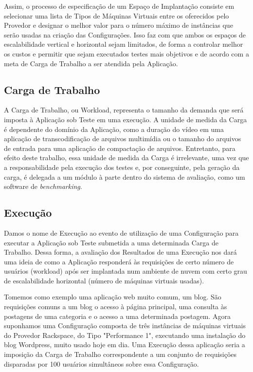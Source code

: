 Assim, o processo de especificação de um Espaço de Implantação consiste em 
selecionar uma lista de Tipos de Máquinas Virtuais entre os oferecidos pelo 
Provedor e designar o melhor valor para o número máximo de instâncias que serão 
usadas na criação das Configurações. Isso faz com que ambos os espaços de 
escalabilidade vertical e horizontal sejam limitados, de forma a controlar 
melhor os custos e permitir que sejam executados testes mais objetivos e de 
acordo com a meta de Carga de Trabalho a ser atendida pela Aplicação.

\subsection{Carga de Trabalho}
A Carga de Trabalho, ou Workload, representa o tamanho da demanda que será 
imposta à Aplicação sob Teste em uma execução. A unidade de medida da Carga é 
dependente do domínio da Aplicação, como a duração do vídeo em uma aplicação
de transcodificação de arquivos multimídia ou o tamanho do arquivos de entrada
para uma aplicação de compactação de arquivos. Entretanto, para efeito deste 
trabalho, essa unidade de medida da Carga é irrelevante, uma vez que a 
responsabilidade pela execução dos testes e, por conseguinte, pela geração da 
carga, é delegada a um módulo à parte dentro do sistema de avaliação, como um
software de \emph{benchmarking}.

\subsection{Execução}
Damos o nome de Execução ao evento de utilização de uma Configuração para 
executar a Aplicação sob Teste submetida a uma determinada Carga de Trabalho. 
Dessa forma, a avaliação dos Resultados de uma Execução nos dará uma ideia de 
como a Aplicação responderá às requisições de certo número de usuários (workload) 
após ser implantada num ambiente de nuvem com certo grau de escalabilidade 
horizontal (número de máquinas virtuais usadas). 

Tomemos como exemplo uma aplicação web muito comum, um blog. São requisições 
comuns a um blog o acesso à página principal, uma consulta às postagens de uma
categoria e o acesso a uma determinada postagem. Agora suponhamos uma Configuração
composta de três instâncias de máquinas virtuais do Provedor Rackspace, do Tipo 
"Performance 1", executando uma instalação do blog Wordpress, muito usado hoje em 
dia. Uma Execução dessa aplicação seria a imposição da Carga de Trabalho correspondente
a um conjunto de requisições disparadas por 100 usuários simultâneos sobre essa Configuração. 

